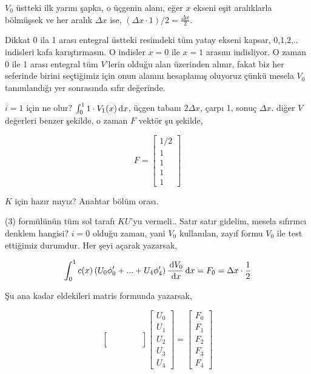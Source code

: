 \documentclass[12pt,fleqn]{article}\usepackage{../../common}
\begin{document}
$V_0$ üstteki ilk yarım şapka, o üçgenin alanı, eğer $x$ ekseni eşit aralıklarla
bölmüşsek ve her aralık $\Delta x$ ise, $(\Delta x \cdot 1) / 2 = \frac{\Delta x}{2}$.

Dikkat 0 ila 1 arası entegral üstteki resimdeki tüm yatay ekseni kapsar,
0,1,2,..  indisleri kafa karıştırmasın. O indisler $x=0$ ile $x=1$ arasını
indisliyor. O zaman 0 ile 1 arası entegral tüm $V$'lerin olduğu alan üzerinden
alınır, fakat biz her seferinde birini seçtiğimiz için onun alanını hesaplamış
oluyoruz çünkü mesela $V_0$ tanımlandığı yer sonrasında sıfır değerinde.

$i=1$ için ne olur? $\int_{0}^{1} 1 \cdot V_1(x) \,\mathrm{d} x$, üçgen tabanı
$2 \Delta x$,  çarpı 1, sonuç $\Delta x$. diğer $V$ değerleri benzer şekilde,
o zaman $F$ vektör şu şekilde,

$$
F = \left[\begin{array}{c}
1/2 \\ 1 \\ 1 \\ 1 \\ 1
\end{array}\right]
$$

$K$ için hazır mıyız? Anahtar bölüm orası.

(3) formülünün tüm sol tarafı $KU$'yu vermeli.. Satır satır gidelim, mesela
sıfırıncı denklem hangisi? $i=0$ olduğu zaman, yani $V_0$ kullanılan, zayıf
formu $V_0$ ile test ettiğimiz durumdur. Her şeyi açarak yazarsak,

$$
\int_{0}^{1} c(x)
\left( U_0 \phi_0' + ... + U_4 \phi_4'  \right)
\frac{\,\mathrm{d} V_0}{\,\mathrm{d} x} \,\mathrm{d} x = F_0 = \Delta x \cdot \frac{1}{2}
$$

Şu ana kadar eldekileri matris formunda yazarsak,

$$
\left[\begin{array}{rrrrr}
 & & & & \\
 & & & & \\
 & & & & \\
 & & & & 
\end{array}\right]
\left[\begin{array}{r}
U_0 \\ U_1 \\ U_2 \\ U_3 \\ U_4
\end{array}\right] =
\left[\begin{array}{r}
F_0 \\ F_1 \\ F_2 \\ F_3 \\ F_4
\end{array}\right]
$$
\end{document}
